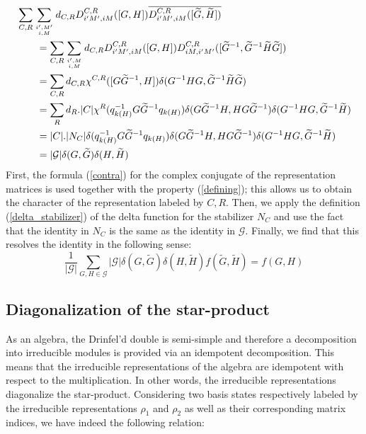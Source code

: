 \documentclass[nofootinbib,superscriptaddress,eqsecnum,tightenlines,11pt]{revtex4-1}
\def\q{\qquad}
\def\wG{\widetilde{G}}
\def\wH{\widetilde{H}}
\def\mG{\mathcal{G}}
\def\be{\begin{equation}}
\def\ee{\end{equation}}
\begin{document}
\begin{align}
	&\sum_{C,R}\sum_{i',M' \atop i,M}d_{C,R} D^{C,R}_{i'M',iM}([G,H])\overline{D^{C,R}_{i'M',iM}([\widetilde{G},\widetilde{H}])} \\
	&\q  = \sum_{C,R} \sum_{i',M \atop i,M}d_{C,R} D^{C,R}_{i'M',iM}([G,H])D^{C,R}_{iM,i'M'}([\widetilde{G}^{-1},\widetilde{G}^{-1}\widetilde{H}\widetilde{G}]) \\
	&\q = \sum_{C,R}d_{C,R} \chi^{C,R}([G\widetilde{G}^{-1},H])\delta(G^{-1}HG,\widetilde{G}^{-1}\widetilde{H}\widetilde{G})\\ 
	&\q = \sum_{R}d_R. |C| \chi^R(q^{-1}_{k(H)}G \widetilde{G}^{-1}q_{k(H)})\delta(G\widetilde{G}^{-1}H,HG\widetilde{G}^{-1})
\delta(G^{-1}HG,\widetilde{G}^{-1}\widetilde{H}) \\ 
	&\q = |C|.|N_{C}|\delta(q^{-1}_{k(H)}G \widetilde{G}^{-1}q_{k(H)})
\delta(G\widetilde{G}^{-1}H,HG\widetilde{G}^{-1})
\delta(G^{-1}HG,\widetilde{G}^{-1}\widetilde{H}) \\ 
	&\q = |\mathcal{G}| \delta(G,\widetilde{G})\delta(H,\widetilde{H})%
\end{align}
First, the formula (\ref{contra}) for the complex conjugate of the representation matrices is used together with the property (\ref{defining}); this allows us to obtain the character of the representation labeled by $C,R$. Then, we apply the definition (\ref{delta_stabilizer}) of the delta function for the stabilizer $N_C$ and use the fact that the identity in $N_C$ is the same as the identity in $\mG$.  Finally, we find that this resolves the identity in the following sense: 
\be
	\frac{1}{|\mG|}\sum_{G,H \in \mG} |\mathcal{G}| \delta(G,\widetilde{G})\delta(H,\widetilde{H}) f(\wG,\wH) = f(G,H)
\ee



\subsection{Diagonalization of the star-product \label{app_diagprod}}

As an algebra, the Drinfel'd double is semi-simple and therefore a decomposition into irreducible modules is provided via an idempotent decomposition. This means that the irreducible representations of the algebra are idempotent with respect to the multiplication. In other words, the irreducible representations diagonalize the star-product. Considering two basis states respectively labeled by the irreducible representations $\rho_1$ and $\rho_2$ as well as their corresponding matrix indices, we have indeed the following relation:
\end{document}
